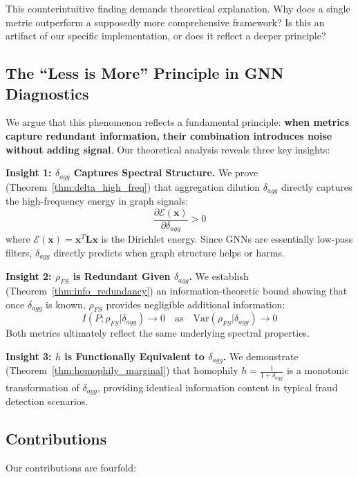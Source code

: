 This counterintuitive finding demands theoretical explanation. Why does a single metric outperform a supposedly more comprehensive framework? Is this an artifact of our specific implementation, or does it reflect a deeper principle?

\subsection{The ``Less is More'' Principle in GNN Diagnostics}

We argue that this phenomenon reflects a fundamental principle: \textbf{when metrics capture redundant information, their combination introduces noise without adding signal}. Our theoretical analysis reveals three key insights:

\textbf{Insight 1: $\delta_{agg}$ Captures Spectral Structure.} We prove (Theorem~\ref{thm:delta_high_freq}) that aggregation dilution $\delta_{agg}$ directly captures the high-frequency energy in graph signals:
\begin{equation}
\frac{\partial \mathcal{E}(\mathbf{x})}{\partial \delta_{agg}} > 0
\end{equation}
where $\mathcal{E}(\mathbf{x}) = \mathbf{x}^T\mathbf{L}\mathbf{x}$ is the Dirichlet energy. Since GNNs are essentially low-pass filters, $\delta_{agg}$ directly predicts when graph structure helps or harms.

\textbf{Insight 2: $\rho_{FS}$ is Redundant Given $\delta_{agg}$.} We establish (Theorem~\ref{thm:info_redundancy}) an information-theoretic bound showing that once $\delta_{agg}$ is known, $\rho_{FS}$ provides negligible additional information:
\begin{equation}
I(P; \rho_{FS} | \delta_{agg}) \to 0 \quad \text{as} \quad \text{Var}(\rho_{FS} | \delta_{agg}) \to 0
\end{equation}
Both metrics ultimately reflect the same underlying spectral properties.

\textbf{Insight 3: $h$ is Functionally Equivalent to $\delta_{agg}$.} We demonstrate (Theorem~\ref{thm:homophily_marginal}) that homophily $h = \frac{1}{1+\delta_{agg}}$ is a monotonic transformation of $\delta_{agg}$, providing identical information content in typical fraud detection scenarios.

\subsection{Contributions}

Our contributions are fourfold:

